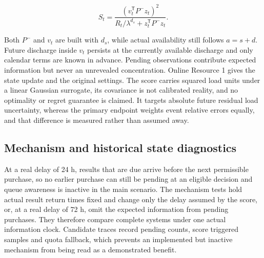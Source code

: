 \documentclass[lineno,pdflatex,sn-apa]{sn-jnl}%
\theoremstyle{thmstyleone}%
\theoremstyle{thmstyletwo}%
\theoremstyle{thmstylethree}%
\begin{document}
\begin{equation}
S_t=\frac{(v_t^{\mathsf T}P^-z_t)^2}{R_t/\lambda^{d_s}+z_t^{\mathsf T}P^-z_t}.
\end{equation}

Both $P^-$ and $v_t$ are built with $d_s$, while actual availability still follows $a=s+d$. Future discharge inside $v_t$ persists at the currently available discharge and only calendar terms are known in advance. Pending observations contribute expected information but never an unrevealed concentration. Online Resource 1 gives the state update and the original settings. The score carries squared load units under a linear Gaussian surrogate, its covariance is not calibrated reality, and no optimality or regret guarantee is claimed. It targets absolute future residual load uncertainty, whereas the primary endpoint weights event relative errors equally, and that difference is measured rather than assumed away.

\subsection{Mechanism and historical state diagnostics}

At a real delay of 24 h, results that are due arrive before the next permissible purchase, so no earlier purchase can still be pending at an eligible decision and queue awareness is inactive in the main scenario. The mechanism tests hold actual result return times fixed and change only the delay assumed by the score, or, at a real delay of 72 h, omit the expected information from pending purchases. They therefore compare complete systems under one actual information clock. Candidate traces record pending counts, score triggered samples and quota fallback, which prevents an implemented but inactive mechanism from being read as a demonstrated benefit.
\end{document}
